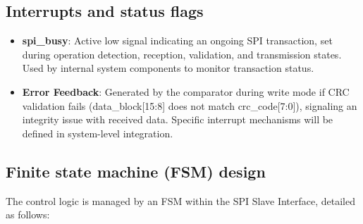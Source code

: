 \subsection{Interrupts and status flags}

\begin{itemize}
    \item \textbf{spi\_busy}: Active low signal indicating an ongoing SPI transaction, set during operation detection, reception, validation, and transmission states. Used by internal system components to monitor transaction status.
    \item \textbf{Error Feedback}: Generated by the comparator during write mode if CRC validation fails (data\_block[15:8] does not match crc\_code[7:0]), signaling an integrity issue with received data. Specific interrupt mechanisms will be defined in system-level integration.
\end{itemize}

\subsection{Finite state machine (FSM) design}

The control logic is managed by an FSM within the SPI Slave Interface, detailed as follows:

